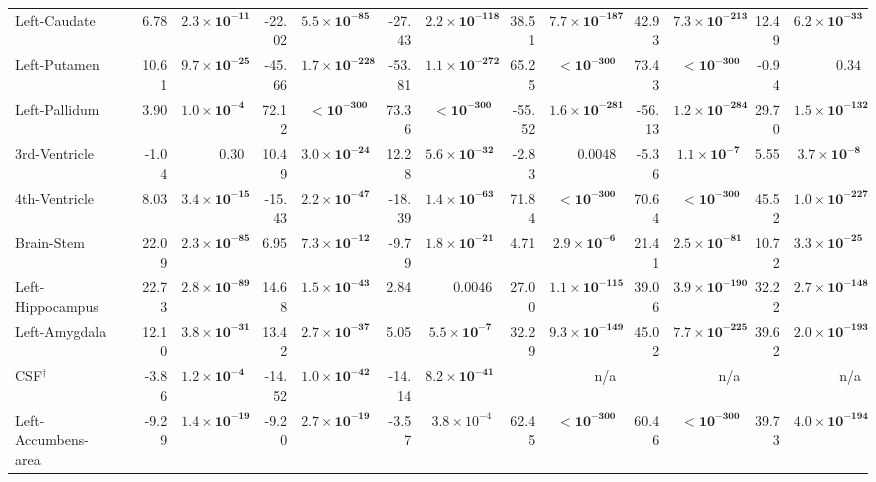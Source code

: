 {\begin{longtable}{llrrrrrrrrrrrr}
Left-Caudate &  & 6.78 & $\mathbf{2.3{\times}10^{-11}}$ & -22.02 & $\mathbf{5.5{\times}10^{-85}}$ & -27.43 & $\mathbf{2.2{\times}10^{-118}}$ & 38.51 & $\mathbf{7.7{\times}10^{-187}}$ & 42.93 & $\mathbf{7.3{\times}10^{-213}}$ & 12.49 & $\mathbf{6.2{\times}10^{-33}}$ \\
Left-Putamen &  & 10.61 & $\mathbf{9.7{\times}10^{-25}}$ & -45.66 & $\mathbf{1.7{\times}10^{-228}}$ & -53.81 & $\mathbf{1.1{\times}10^{-272}}$ & 65.25 & $\mathbf{{<}10^{-300}}$ & 73.43 & $\mathbf{{<}10^{-300}}$ & -0.94 & $0.34$ \\
Left-Pallidum &  & 3.90 & $\mathbf{1.0{\times}10^{-4}}$ & 72.12 & $\mathbf{{<}10^{-300}}$ & 73.36 & $\mathbf{{<}10^{-300}}$ & -55.52 & $\mathbf{1.6{\times}10^{-281}}$ & -56.13 & $\mathbf{1.2{\times}10^{-284}}$ & 29.70 & $\mathbf{1.5{\times}10^{-132}}$ \\
3rd-Ventricle &  & -1.04 & $0.30$ & 10.49 & $\mathbf{3.0{\times}10^{-24}}$ & 12.28 & $\mathbf{5.6{\times}10^{-32}}$ & -2.83 & $0.0048$ & -5.36 & $\mathbf{1.1{\times}10^{-7}}$ & 5.55 & $\mathbf{3.7{\times}10^{-8}}$ \\
4th-Ventricle &  & 8.03 & $\mathbf{3.4{\times}10^{-15}}$ & -15.43 & $\mathbf{2.2{\times}10^{-47}}$ & -18.39 & $\mathbf{1.4{\times}10^{-63}}$ & 71.84 & $\mathbf{{<}10^{-300}}$ & 70.64 & $\mathbf{{<}10^{-300}}$ & 45.52 & $\mathbf{1.0{\times}10^{-227}}$ \\
Brain-Stem &  & 22.09 & $\mathbf{2.3{\times}10^{-85}}$ & 6.95 & $\mathbf{7.3{\times}10^{-12}}$ & -9.79 & $\mathbf{1.8{\times}10^{-21}}$ & 4.71 & $\mathbf{2.9{\times}10^{-6}}$ & 21.41 & $\mathbf{2.5{\times}10^{-81}}$ & 10.72 & $\mathbf{3.3{\times}10^{-25}}$ \\
Left-Hippocampus &  & 22.73 & $\mathbf{2.8{\times}10^{-89}}$ & 14.68 & $\mathbf{1.5{\times}10^{-43}}$ & 2.84 & $0.0046$ & 27.00 & $\mathbf{1.1{\times}10^{-115}}$ & 39.06 & $\mathbf{3.9{\times}10^{-190}}$ & 32.22 & $\mathbf{2.7{\times}10^{-148}}$ \\
Left-Amygdala &  & 12.10 & $\mathbf{3.8{\times}10^{-31}}$ & 13.42 & $\mathbf{2.7{\times}10^{-37}}$ & 5.05 & $\mathbf{5.5{\times}10^{-7}}$ & 32.29 & $\mathbf{9.3{\times}10^{-149}}$ & 45.02 & $\mathbf{7.7{\times}10^{-225}}$ & 39.62 & $\mathbf{2.0{\times}10^{-193}}$ \\
CSF$^{\dagger}$ &  & -3.86 & $\mathbf{1.2{\times}10^{-4}}$ & -14.52 & $\mathbf{1.0{\times}10^{-42}}$ & -14.14 & $\mathbf{8.2{\times}10^{-41}}$ &  & n/a &  & n/a &  & n/a \\
Left-Accumbens-area &  & -9.29 & $\mathbf{1.4{\times}10^{-19}}$ & -9.20 & $\mathbf{2.7{\times}10^{-19}}$ & -3.57 & $3.8{\times}10^{-4}$ & 62.45 & $\mathbf{{<}10^{-300}}$ & 60.46 & $\mathbf{{<}10^{-300}}$ & 39.73 & $\mathbf{4.0{\times}10^{-194}}$ \\

\end{longtable}}
